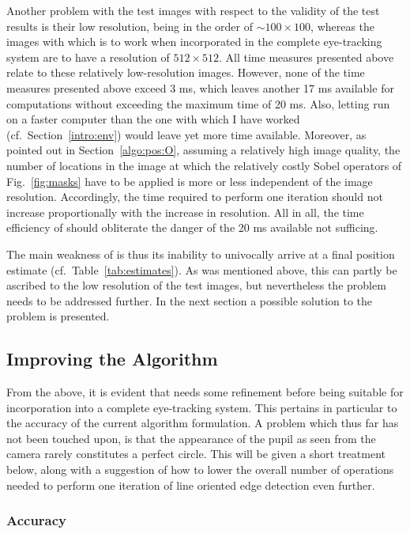 Another problem with the test images with respect to the validity of
the test results is their low resolution, being in the order of $\sim
100\times 100$, whereas the images with which {\octopus} is to work
when incorporated in the complete eye-tracking system are to have a
resolution of $512\times 512$.  All time measures presented above
relate to these relatively low-resolution images.  However, none of
the time measures presented above exceed 3 ms, which leaves another 17
ms available for computations without exceeding the maximum time of 20
ms.  Also, letting {\octopus} run on a faster computer than the one
with which I have worked (cf.\ Section~\ref{intro:env}) would leave
yet more time available.  Moreover, as pointed out in
Section~\ref{algo:pos:O}, assuming a relatively high image quality,
the number of locations in the image at which the relatively costly
Sobel operators of Fig.~\ref{fig:masks} have to be applied is more or
less independent of the image resolution.  Accordingly, the time
required to perform one iteration should not increase proportionally
with the increase in resolution.  All in all, the time efficiency of
{\octopus} should obliterate the danger of the 20 ms available not
sufficing.

The main weakness of {\octopus} is thus its inability to univocally
arrive at a final position estimate (cf.\ Table~\ref{tab:estimates}).
As was mentioned above, this can partly be ascribed to the low
resolution of the test images, but nevertheless the problem needs to
be addressed further.  In the next section a possible solution to the
problem is presented.

\subsection{Improving the Algorithm}
\label{algo:eval:improve}

From the above, it is evident that {\octopus} needs some refinement
before being suitable for incorporation into a complete eye-tracking
system.  This pertains in particular to the accuracy of the current
algorithm formulation.  A problem which thus far has not been touched
upon, is that the appearance of the pupil as seen from the camera
rarely constitutes a perfect circle.  This will be given a short
treatment below, along with a suggestion of how to lower the overall
number of operations needed to perform one iteration of line oriented
edge detection even further.

\subsubsection{Accuracy}

